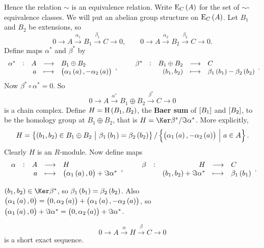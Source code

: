 \pagebreak

Hence the relation $ \sim $ is an equivalence relation. Write $ \E_C\br{A} $ for the set of $ \sim $-equivalence classes. We will put an abelian group structure on $ \E_C\br{A} $. Let $ B_1 $ and $ B_2 $ be extensions, so
$$ 0 \to A \xrightarrow{\alpha_1} B_1 \xrightarrow{\beta_1} C \to 0, \qquad 0 \to A \xrightarrow{\alpha_2} B_2 \xrightarrow{\beta_2} C \to 0. $$
Define maps $ \alpha^* $ and $ \beta^* $ by
$$ \function[\alpha^*]{A}{B_1 \oplus B_2}{a}{\br{\alpha_1\br{a}, -\alpha_2\br{a}}}, \qquad \function[\beta^*]{B_1 \oplus B_2}{C}{\br{b_1, b_2}}{\beta_1\br{b_1} - \beta_2\br{b_2}}. $$
Now $ \beta^* \circ \alpha^* = 0 $. So
$$ 0 \to A \xrightarrow{\alpha^*} B_1 \oplus B_2 \xrightarrow{\beta^*} C \to 0 $$
is a chain complex. Define $ H = \H\br{B_1, B_2} $, the \textbf{Baer sum} of $ \sbr{B_1} $ and $ \sbr{B_2} $, to be the homology group at $ B_1 \oplus B_2 $, that is $ H = \Ker \beta^* / \Im \alpha^* $. More explicitly,
$$ H = \cbr{\br{b_1, b_2} \in B_1 \oplus B_2 \st \beta_1\br{b_1} = \beta_2\br{b_2}} / \cbr{\br{\alpha_1\br{a}, -\alpha_2\br{a}} \st a \in A}. $$
Clearly $ H $ is an $ R $-module. Now define maps
$$ \function[\alpha]{A}{H}{a}{\br{\alpha_1\br{a}, 0} + \Im \alpha^*}, \qquad \function[\beta]{H}{C}{\br{b_1, b_2} + \Im \alpha^*}{\beta_1\br{b_1}}. $$


\begin{note*}
$ \br{b_1, b_2} \in \Ker \beta^* $, so $ \beta_1\br{b_1} = \beta_2\br{b_2} $. Also $ \br{\alpha_1\br{a}, 0} = \br{0, \alpha_2\br{a}} + \br{\alpha_1\br{a}, -\alpha_2\br{a}} $, so $ \br{\alpha_1\br{a}, 0} + \Im \alpha^* = \br{0, \alpha_2\br{a}} + \Im \alpha^* $.
\end{note*}

\begin{proposition}
$$ 0 \to A \xrightarrow{\alpha} H \xrightarrow{\beta} C \to 0 $$
is a short exact sequence.
\end{proposition}

